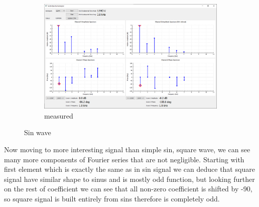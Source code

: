 \documentclass[notitlepage, a4paper, 11pt]{article}
\begin{document}
\begin{figure}[H]
\begin{subfigure}[][][t]{0.3\textwidth}
			\includegraphics[width=\textwidth, trim=10 80 555 100, clip]{../img/Circuit1/sin}
			\caption{measured}
			\label{fig:meas-signal-a}
		\end{subfigure}
		\caption{Sin wave}
		\label{fig:pure-sin}
	\end{figure}
	
	Now moving to more interesting signal than simple sin, square wave, we can see many more components of Fourier series that are not negligible. Starting with first element which is exactly the same as in sin signal we can deduce that square signal have similar shape to sinus and is mostly odd function, but looking further on the rest of coefficient we can see that all non-zero coefficient is shifted by -90\degree, so square signal is built entirely from sins therefore is completely odd.
	
\end{document}
